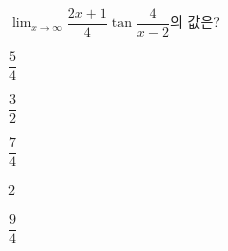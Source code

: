 $\displaystyle\lim_{x\to\infty}\dfrac{2x+1}{4}\tan\dfrac{4}{x-2}$의 값은?
\begin{choices32}{\rule[-3ex]{0pt}{8ex}$\dfrac{5}{4}$}{\rule[-3ex]{0pt}{8ex}$\dfrac{3}{2}$}{\rule[-3ex]{0pt}{8ex}$\dfrac{7}{4}$}{\rule[-3ex]{0pt}{8ex}$2$}{\rule[-3ex]{0pt}{8ex}$\dfrac{9}{4}$}\end{choices32}
